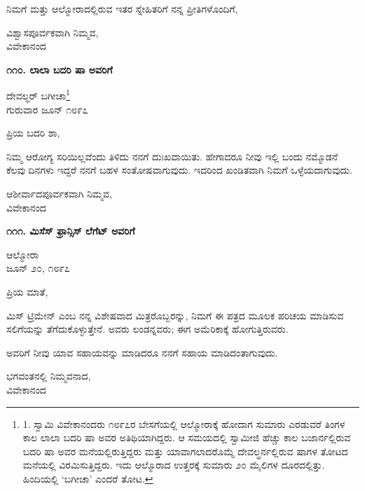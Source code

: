 ನಿಮಗೆ ಮತ್ತು ಆಲ್ಮೋರಾದಲ್ಲಿರುವ ಇತರ ಸ್ನೇಹಿತರಿಗೆ ನನ್ನ ಪ್ರೀತಿಗಳೊಂದಿಗೆ,

\begin{flushright}
ವಿಶ್ವಾಸಪೂರ್ವಕವಾಗಿ ನಿಮ್ಮವ,\\ವಿವೇಕಾನಂದ
\end{flushright}

\begin{center}
\textbf{೧೧೦. ಲಾಲಾ ಬದರಿ ಷಾ ಅವರಿಗೆ}
\end{center}

\begin{flushright}
ದೇವಲ್ಧರ್ ಬಗೀಚಾ\footnote{1. ಸ್ವಾಮಿ ವಿವೇಕಾನಂದರು ೧೮೯೭ರ ಬೇಸಗೆಯಲ್ಲಿ ಆಲ್ಮೋರಾಕ್ಕೆ ಹೋದಾಗ ಸುಮಾರು ಎರಡುವರೆ ತಿಂಗಳ ಕಾಲ ಲಾಲಾ ಬದರಿ ಷಾ ಅವರ ಅತಿಥಿಯಾಗಿದ್ದರು. ಆ ಸಮಯದಲ್ಲಿ ಸ್ವಾಮೀಜಿ ಹೆಚ್ಚು ಕಾಲ ಬಜಾರ್ನಲ್ಲಿರುವ ಬದರಿ ಷಾ ಅವರ ಮನೆಯಲ್ಲಿರುತ್ತಿದ್ದರು ಮತ್ತು ಯಾವಾಗಲಾದರೊಮ್ಮೆ ದೇವಲ್ಧರ್ನಲ್ಲಿರುವ ಷಾಗಳ ತೋಟದ ಮನೆಯಲ್ಲಿ ವಿರಮಿಸುತ್ತಿದ್ದರು. ಇದು ಆಲ್ಮೊರಾದ ಉತ್ತರಕ್ಕೆ ಸುಮಾರು ೨೦ ಮೈಲಿಗಳ ದೂರದಲ್ಲಿತ್ತು. ಹಿಂದಿಯಲ್ಲಿ ‘ಬಗೀಚಾ’ ಎಂದರೆ ತೋಟ.}\\ಗುರುವಾರ ಜೂನ್ ೧೮೯೭
\end{flushright}

ಪ್ರಿಯ ಬದರಿ ಶಾ,

ನಿಮ್ಮ ಆರೋಗ್ಯ ಸರಿಯಿಲ್ಲವೆಂದು ತಿಳಿದು ನನಗೆ ದುಃಖವಾಯಿತು. ಹೇಗಾದರೂ ನೀವು ಇಲ್ಲಿ ಬಂದು ನಮ್ಮೊಡನೆ ಕೆಲವು ದಿನಗಳು ಇದ್ದರೆ ನನಗೆ ಬಹಳ ಸಂತೋಷವಾಗುವುದು. ಇದರಿಂದ ಖಂಡಿತವಾಗಿ ನಿಮಗೆ ಒಳ್ಳೆಯದಾಗುವುದು.

\begin{flushright}
ಆಶೀರ್ವಾದಪೂರ್ವಕವಾಗಿ ನಿಮ್ಮವ,\\ವಿವೇಕಾನಂದ
\end{flushright}

\begin{center}
\textbf{೧೧೧. ಮಿಸೆಸ್ ಫ್ರಾನ್ಸಿಸ್ ಲೆಗೆಟ್ ಅವರಿಗೆ}
\end{center}

\begin{flushright}
ಆಲ್ಮೋರಾ\\ಜೂನ್ ೨೦, ೧೮೯೭
\end{flushright}

ಪ್ರಿಯ ಮಾತೆ,

ಮಿಸ್ ಟ್ರಿಮೇನ್ ಎಂಬ ನನ್ನ ವಿಶೇಷವಾದ ಮಿತ್ರರೊಬ್ಬರನ್ನು, ನಿಮಗೆ ಈ ಪತ್ರದ ಮೂಲಕ ಪರಿಚಯ ಮಾಡಿಸುವ ಸಲಿಗೆಯನ್ನು ತೆಗೆದುಕೊಳ್ಳುತ್ತೇನೆ. ಅವರು ಲಂಡನ್ನವರು; ಈಗ ಅಮೆರಿಕಾಕ್ಕೆ ಹೋಗುತ್ತಿರುವರು.

ಅವರಿಗೆ ನೀವು ಯಾವ ಸಹಾಯವನ್ನು ಮಾಡಿದರೂ ನನಗೆ ಸಹಾಯ ಮಾಡಿದಂತಾಗುವುದು.

\begin{flushright}
ಭಗವಂತನಲ್ಲಿ ನಿಮ್ಮವನಾದ,\\ವಿವೇಕಾನಂದ
\end{flushright}

